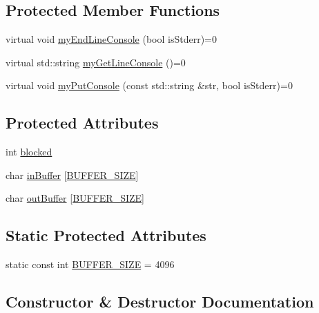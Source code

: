 \subsection*{Protected Member Functions}
\begin{DoxyCompactItemize}
\item 
virtual void \mbox{\hyperlink{classstanfordcpplib_1_1ConsoleStreambuf_a783b4396763512a17fb6e825df868c16}{my\+End\+Line\+Console}} (bool is\+Stderr)=0
\item 
virtual std\+::string \mbox{\hyperlink{classstanfordcpplib_1_1ConsoleStreambuf_a72b9cdcc2c68caf7acef81651071a14f}{my\+Get\+Line\+Console}} ()=0
\item 
virtual void \mbox{\hyperlink{classstanfordcpplib_1_1ConsoleStreambuf_a090e9d08f0bd2092bf352d419bdd2a15}{my\+Put\+Console}} (const std\+::string \&str, bool is\+Stderr)=0
\end{DoxyCompactItemize}
\subsection*{Protected Attributes}
\begin{DoxyCompactItemize}
\item 
int \mbox{\hyperlink{classstanfordcpplib_1_1ConsoleStreambuf_ac74e3d5a1b1eeb5c8e32867ad62823f0}{blocked}}
\item 
char \mbox{\hyperlink{classstanfordcpplib_1_1ConsoleStreambuf_a6dfeba2ed7f89c327dd07f6136b2a256}{in\+Buffer}} \mbox{[}\mbox{\hyperlink{classstanfordcpplib_1_1ConsoleStreambuf_a91f806c1bc7c1f4f402a627773840252}{B\+U\+F\+F\+E\+R\+\_\+\+S\+I\+ZE}}\mbox{]}
\item 
char \mbox{\hyperlink{classstanfordcpplib_1_1ConsoleStreambuf_a015231cbe2f7737eee637ddee666f1dd}{out\+Buffer}} \mbox{[}\mbox{\hyperlink{classstanfordcpplib_1_1ConsoleStreambuf_a91f806c1bc7c1f4f402a627773840252}{B\+U\+F\+F\+E\+R\+\_\+\+S\+I\+ZE}}\mbox{]}
\end{DoxyCompactItemize}
\subsection*{Static Protected Attributes}
\begin{DoxyCompactItemize}
\item 
static const int \mbox{\hyperlink{classstanfordcpplib_1_1ConsoleStreambuf_a91f806c1bc7c1f4f402a627773840252}{B\+U\+F\+F\+E\+R\+\_\+\+S\+I\+ZE}} = 4096
\end{DoxyCompactItemize}


\subsection{Constructor \& Destructor Documentation}
\mbox{\label{classstanfordcpplib_1_1ConsoleStreambuf_a00319cc8035be74bbc3bb63d60b8c8da}} 
